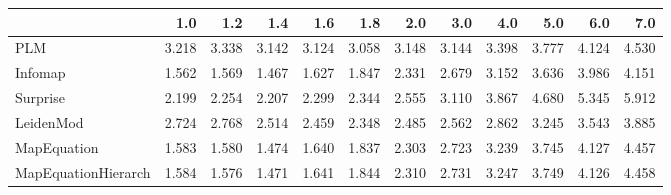 \begin{tabular}{lrrrrrrrrrrr}
\toprule
{} &   1.0 &   1.2 &   1.4 &   1.6 &   1.8 &   2.0 &   3.0 &   4.0 &   5.0 &   6.0 &   7.0 \\
\midrule
PLM                 & 3.218 & 3.338 & 3.142 & 3.124 & 3.058 & 3.148 & 3.144 & 3.398 & 3.777 & 4.124 & 4.530 \\
Infomap             & 1.562 & 1.569 & 1.467 & 1.627 & 1.847 & 2.331 & 2.679 & 3.152 & 3.636 & 3.986 & 4.151 \\
Surprise            & 2.199 & 2.254 & 2.207 & 2.299 & 2.344 & 2.555 & 3.110 & 3.867 & 4.680 & 5.345 & 5.912 \\
LeidenMod           & 2.724 & 2.768 & 2.514 & 2.459 & 2.348 & 2.485 & 2.562 & 2.862 & 3.245 & 3.543 & 3.885 \\
MapEquation         & 1.583 & 1.580 & 1.474 & 1.640 & 1.837 & 2.303 & 2.723 & 3.239 & 3.745 & 4.127 & 4.457 \\
MapEquationHierarch & 1.584 & 1.576 & 1.471 & 1.641 & 1.844 & 2.310 & 2.731 & 3.247 & 3.749 & 4.126 & 4.458 \\
\bottomrule
\end{tabular}
